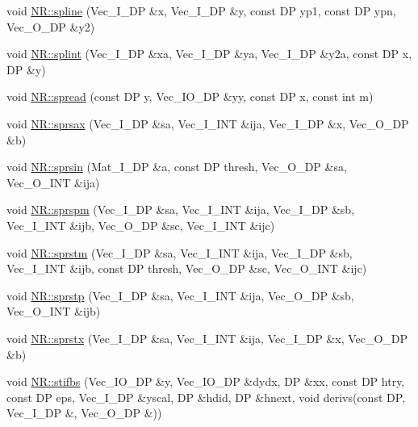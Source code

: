 \begin{DoxyCompactItemize}
void \mbox{\hyperlink{namespaceNR_a5c106df532661250db9a1edaec21e355}{N\+R\+::spline}} (Vec\+\_\+\+I\+\_\+\+DP \&x, Vec\+\_\+\+I\+\_\+\+DP \&y, const DP yp1, const DP ypn, Vec\+\_\+\+O\+\_\+\+DP \&y2)
\item 
void \mbox{\hyperlink{namespaceNR_af17868718dea0cf57360a9a84b1bf76f}{N\+R\+::splint}} (Vec\+\_\+\+I\+\_\+\+DP \&xa, Vec\+\_\+\+I\+\_\+\+DP \&ya, Vec\+\_\+\+I\+\_\+\+DP \&y2a, const DP x, DP \&y)
\item 
void \mbox{\hyperlink{namespaceNR_add2c8f2338d667862d2851438e2bbcd9}{N\+R\+::spread}} (const DP y, Vec\+\_\+\+I\+O\+\_\+\+DP \&yy, const DP x, const int m)
\item 
void \mbox{\hyperlink{namespaceNR_a569952912ee7ce4678374a5ab9720728}{N\+R\+::sprsax}} (Vec\+\_\+\+I\+\_\+\+DP \&sa, Vec\+\_\+\+I\+\_\+\+I\+NT \&ija, Vec\+\_\+\+I\+\_\+\+DP \&x, Vec\+\_\+\+O\+\_\+\+DP \&b)
\item 
void \mbox{\hyperlink{namespaceNR_ac6049ef83ac59033cd16008d6434dbd9}{N\+R\+::sprsin}} (Mat\+\_\+\+I\+\_\+\+DP \&a, const DP thresh, Vec\+\_\+\+O\+\_\+\+DP \&sa, Vec\+\_\+\+O\+\_\+\+I\+NT \&ija)
\item 
void \mbox{\hyperlink{namespaceNR_a5e13fa9b150938fe86e025d574065cba}{N\+R\+::sprspm}} (Vec\+\_\+\+I\+\_\+\+DP \&sa, Vec\+\_\+\+I\+\_\+\+I\+NT \&ija, Vec\+\_\+\+I\+\_\+\+DP \&sb, Vec\+\_\+\+I\+\_\+\+I\+NT \&ijb, Vec\+\_\+\+O\+\_\+\+DP \&sc, Vec\+\_\+\+I\+\_\+\+I\+NT \&ijc)
\item 
void \mbox{\hyperlink{namespaceNR_a8a8f5c184fd77f33204bf0529388c245}{N\+R\+::sprstm}} (Vec\+\_\+\+I\+\_\+\+DP \&sa, Vec\+\_\+\+I\+\_\+\+I\+NT \&ija, Vec\+\_\+\+I\+\_\+\+DP \&sb, Vec\+\_\+\+I\+\_\+\+I\+NT \&ijb, const DP thresh, Vec\+\_\+\+O\+\_\+\+DP \&sc, Vec\+\_\+\+O\+\_\+\+I\+NT \&ijc)
\item 
void \mbox{\hyperlink{namespaceNR_afda5189ac62139477b4017822d258544}{N\+R\+::sprstp}} (Vec\+\_\+\+I\+\_\+\+DP \&sa, Vec\+\_\+\+I\+\_\+\+I\+NT \&ija, Vec\+\_\+\+O\+\_\+\+DP \&sb, Vec\+\_\+\+O\+\_\+\+I\+NT \&ijb)
\item 
void \mbox{\hyperlink{namespaceNR_aa3a3114b55f3fd188fccc24ab74a1906}{N\+R\+::sprstx}} (Vec\+\_\+\+I\+\_\+\+DP \&sa, Vec\+\_\+\+I\+\_\+\+I\+NT \&ija, Vec\+\_\+\+I\+\_\+\+DP \&x, Vec\+\_\+\+O\+\_\+\+DP \&b)
\item 
void \mbox{\hyperlink{namespaceNR_ad2ae3e12b7597c2a4702755e6a387786}{N\+R\+::stifbs}} (Vec\+\_\+\+I\+O\+\_\+\+DP \&y, Vec\+\_\+\+I\+O\+\_\+\+DP \&dydx, DP \&xx, const DP htry, const DP eps, Vec\+\_\+\+I\+\_\+\+DP \&yscal, DP \&hdid, DP \&hnext, void derivs(const DP, Vec\+\_\+\+I\+\_\+\+DP \&, Vec\+\_\+\+O\+\_\+\+DP \&))

\end{DoxyCompactItemize}
